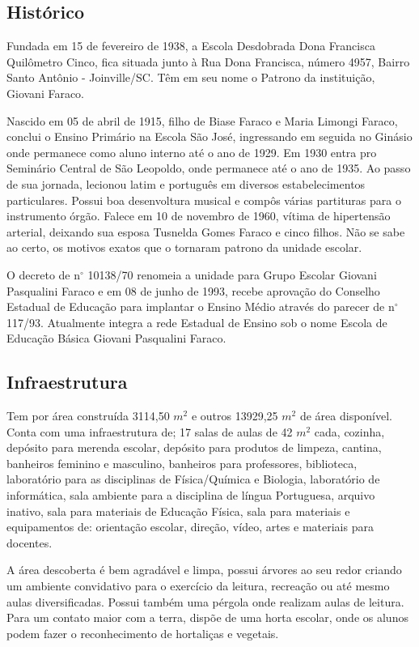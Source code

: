 \subsection{Histórico}
Fundada em 15 de fevereiro de 1938, a Escola Desdobrada Dona Francisca Quilômetro Cinco, fica situada junto à Rua Dona Francisca, número 4957, Bairro Santo Antônio -  Joinville/SC. Têm em seu nome o Patrono da instituição, Giovani Faraco.

Nascido em 05 de abril de 1915, filho de Biase Faraco e Maria Limongi Faraco, conclui o Ensino Primário na Escola São José, ingressando em seguida no Ginásio onde permanece como aluno interno até o ano de 1929. Em 1930 entra pro Seminário Central de São Leopoldo, onde permanece até o ano de 1935. Ao passo de sua jornada, lecionou latim e português em diversos estabelecimentos particulares. Possui boa desenvoltura musical e compôs várias partituras para o instrumento órgão. Falece em 10 de novembro de 1960, vítima de hipertensão arterial, deixando sua esposa Tusnelda Gomes Faraco e cinco filhos. Não se sabe ao certo, os motivos exatos que o tornaram patrono da unidade escolar.

O decreto de n$^\circ$ 10138/70 renomeia a unidade para Grupo Escolar Giovani Pasqualini Faraco e em 08 de junho de 1993, recebe aprovação do Conselho Estadual de Educação para implantar o Ensino Médio através do parecer de n$^\circ$ 117/93. Atualmente integra a rede Estadual de Ensino sob o nome Escola de Educação Básica Giovani Pasqualini Faraco.

\subsection{Infraestrutura}
Tem por área construída 3114,50 $m^2$ e outros 13929,25 $m^2$ de área disponível. Conta com uma infraestrutura de; 17 salas de aulas  de 42 $m^2$ cada, cozinha, depósito para merenda escolar, depósito para produtos de limpeza, cantina, banheiros feminino e masculino, banheiros para professores, biblioteca, laboratório para as disciplinas de Física/Química e Biologia, laboratório de informática, sala ambiente para a disciplina de língua Portuguesa, arquivo inativo, sala para materiais de Educação Física, sala para materiais e equipamentos de: orientação escolar, direção, vídeo, artes e materiais para docentes.

A área descoberta é bem agradável e limpa, possui árvores ao seu redor criando um ambiente convidativo para o exercício da leitura, recreação ou até mesmo aulas diversificadas. Possui também uma pérgola onde realizam aulas de leitura. Para um contato maior com a terra, dispõe de uma horta escolar, onde os alunos podem fazer o reconhecimento de hortaliças e vegetais.

